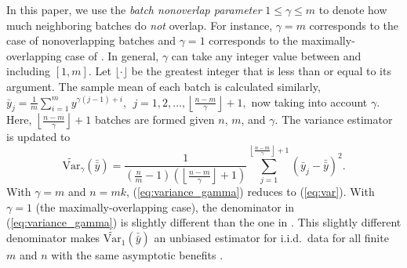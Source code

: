 \documentclass[12pt]{article}
\newcommand{\vartg}[1]{\widetilde{\mathrm{Var}}_\gamma \left( #1 \right)}
\newcommand{\vto}[1]{\widetilde{\mathrm{Var}}_{1} \left( #1 \right)}
\newcommand{\nb}{\left\lfloor\tfrac{n-m}{\gamma}\right\rfloor+1}
\newcommand{\yb}{\bar{y}}
\newcommand{\ybb}{\bar{\yb}}
\begin{document}
In this paper, we use the {\it batch nonoverlap parameter} $1 \leq \gamma \leq m$ to denote how much neighboring batches do {\it not} overlap.  
For instance, $\gamma = m$ corresponds to the case of nonoverlapping batches and $\gamma = 1$ corresponds to the maximally-overlapping case of \citet{Meketon1984}.  
In general, $\gamma$ can take any integer value between and including $[1,m]$. 
Let $\lfloor \cdot \rfloor$ be the greatest integer that is less than or equal to its argument. 
The sample mean of each batch is calculated similarly, 
$
\yb_j = \frac{1}{m} \sum_{i=1}^m y^{\gamma(j-1) + i},\ \  j = 1, 2, \dots, \nb, 
$
now taking into account $\gamma$.  
Here, $\nb$ batches are formed given $n$, $m$, and $\gamma$.  
The variance estimator is updated to
\begin{equation} \label{eq:variance_gamma}
	\vartg{\ybb} = \frac{1}{\left( \tfrac{n}{m} - 1 \right) \left( \nb \right)}  \sum_{j=1}^{\nb} (\yb_j - \ybb)^2.
\end{equation}
With $\gamma=m$ and $n=mk$, (\ref{eq:variance_gamma}) reduces to (\ref{eq:var}).
With $\gamma=1$ (the maximally-overlapping case), the denominator in (\ref{eq:variance_gamma}) is slightly different than the one in  \citep{Meketon1984}.
This slightly different denominator 
makes $\vto{\ybb}$ an unbiased estimator for i.i.d.\ data for all finite $m$ and $n$ with the same asymptotic benefits \citep{Song1992}. 
 
\end{document}
